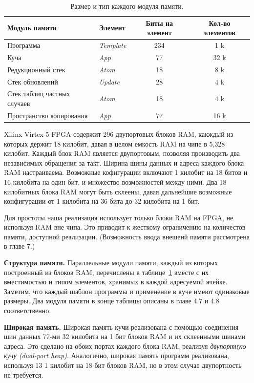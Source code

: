 \documentclass[flenqn, 14pt]{extarticle}
\begin{document}
\begin{table}
\caption{Размер и тип каждого модуля памяти.}
\label{tab:memory_units}
\begin{tabularx}{\textwidth}{Xlcc}
\hline\hline
Модуль памяти & Элемент & Биты на элемент & Кол-во элементов \\
\hline
Программа                   & \emph{Template} & 234 & \hspace{7pt}1 k \\
Куча                        & \emph{App}      & 77  & 32 k \\
Редукционный стек           & \emph{Atom}     & 18  & \hspace{7pt}8 k \\
Стек обновлений             & \emph{Update}   & 28  & \hspace{7pt}4 k \\
Стек таблиц частных случаев & \emph{Atom}     & 18  & \hspace{7pt}4 k \\
Пространство копирования    & \emph{App}      & 77  & 16 k \\
\hline\hline
\end{tabularx}
\end{table}
Xilinx Virtex-5 FPGA содержит 296 двупортовых блоков RAM, какждый из которых держит 18 килобит, давая в целом емкость RAM на чипе в 5,328 килобит. Каждый блок RAM является двупортовым, позволяя производить два независимых обращения за такт. Ширина шины данных и адреса каждого блока RAM настраиваема. Возможные кофигурации включают 1 килобит на 18 битов и 16 килобита на один бит, и множество возможностей между ними. Два 18 килобитных блока RAM могут быть склеены, давая дальнейшие возможные конфигурации от 1 килобита на 36 бита до 32 килобита на 1 бит.

Для простоты наша реализация использует только блоки RAM на FPGA, не используя RAM вне чипа. Это приводит к жесткому ограничению на количестов памяти, доступной реализации. (Возможность ввода внешенй памяти рассмотрена в главе 7.)

\textbf{Структура памяти.} Параллельные модули памяти, каждый из которых построенный из блоков RAM, перечислены в таблице~\ref{tab:memory_units} вместе с их вместимостью и типом элементов, хранимых в каждой адресуемой ячейке. Заметим, что каждый шаблон программы и применение в куче имеют одинаковые размеры. Два модуля памяти в конце таблицы описаны в главе 4.7 и 4.8 соответственно.

\textbf{Широкая память.} Широкая память кучи реализована с помощью соединения шин данных 77-ми 32 килобита на 1 бит блоков RAM и их склеенными шинами адреса. Это сделано на обоих портах каждого блока RAM, реализуя \textit{двупортную кучу (dual-port heap)}. Аналогично, широкая память программ реализована, используя 13 1 килобит на 18 бит блоков RAM, но в этом случае двупортность не требуется.
\end{document}
